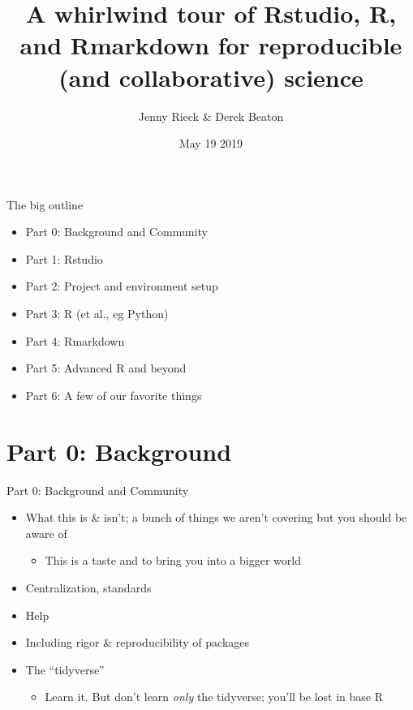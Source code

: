 \documentclass[
  ignorenonframetext,
]{beamer}
\title{A whirlwind tour of Rstudio, R, and Rmarkdown for reproducible (and
collaborative) science}
\author{Jenny Rieck \& Derek Beaton}
\date{May 19 2019}
\providecommand{\tightlist}{%
  \setlength{\itemsep}{0pt}\setlength{\parskip}{0pt}}
\begin{document}
\frame{\titlepage}

\begin{frame}{The big outline}
\protect\hypertarget{the-big-outline}{}

\begin{itemize}
\tightlist
\item
  Part 0: Background and Community
\item
  Part 1: Rstudio
\item
  Part 2: Project and environment setup
\item
  Part 3: R (et al., eg Python)
\item
  Part 4: Rmarkdown
\item
  Part 5: Advanced R and beyond
\item
  Part 6: A few of our favorite things
\end{itemize}

\end{frame}

\hypertarget{part-0-background}{%
\section{Part 0: Background}\label{part-0-background}}

\begin{frame}{Part 0: Background and Community}
\protect\hypertarget{part-0-background-and-community}{}

\begin{itemize}
\tightlist
\item
  What this is \& isn't; a bunch of things we aren't covering but you
  should be aware of

  \begin{itemize}
  \tightlist
  \item
    This is a taste and to bring you into a bigger world
  \end{itemize}
\item
  Centralization, standards
\item
  Help
\item
  Including rigor \& reproducibility of packages
\item
  The ``tidyverse''

  \begin{itemize}
  \tightlist
  \item
    Learn it. But don't learn \emph{only} the tidyverse; you'll be lost
    in base R
  \end{itemize}
\end{itemize}

\end{frame}
\end{document}
